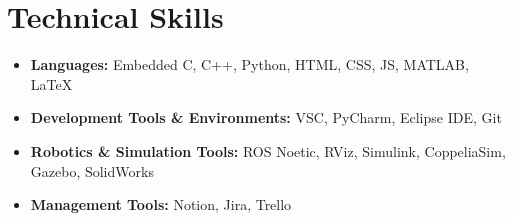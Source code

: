 \section*{Technical Skills}
%
%
%
\begin{itemize}
  \item \textbf{Languages:} Embedded C, C++, Python, HTML, CSS, JS, MATLAB, LaTeX
  \item \textbf{Development Tools \& Environments:} VSC, PyCharm, Eclipse IDE, Git
  \item \textbf{Robotics \& Simulation Tools:} ROS Noetic, RViz, Simulink, CoppeliaSim, Gazebo, SolidWorks
  \item \textbf{Management Tools:} Notion, Jira, Trello
\end{itemize}